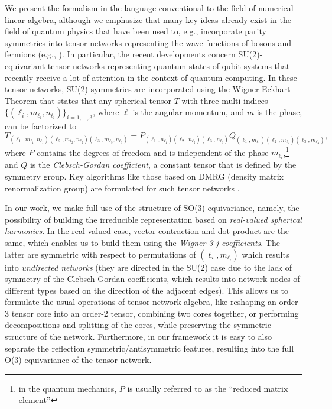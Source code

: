 We present the formalism in the language conventional to the field of numerical linear algebra, although we emphasize that many key ideas already exist in the field of quantum physics that have been used to, e.g., incorporate parity symmetries into tensor networks representing the wave functions of bosons and fermions (e.g., \citep{hutter_representing_2020}).
In particular, the recent developments \citep{orus_tensor_2019} concern SU(2)-equivariant tensor networks \citep{weichselbaum_nonabelian_2012} representing quantum states of qubit systems that recently receive a lot of attention in the context of quantum computing.
In these tensor networks, SU(2) symmetries are incorporated using the Wigner-Eckhart Theorem that states that any spherical tensor $T$ with three multi-indices $\{ (\ell_i,m_{\ell_i},n_{\ell_i}) \}_{i=1,\ldots,3}$, where $\ell$ is the angular momentum, and $m$ is the phase, can be factorized to
\begin{equation}\label{eq:Wigner-Eckhart-Theorem}
    T_{(\ell_1,m_{\ell_1},n_{\ell_1})(\ell_2,m_{\ell_2},n_{\ell_2})(\ell_3,m_{\ell_3},n_{\ell_3})}
    =
    P_{(\ell_1,n_{\ell_1})(\ell_2,n_{\ell_2})(\ell_3,n_{\ell_3})}
    Q_{(\ell_1,m_{\ell_1})(\ell_2,m_{\ell_2})(\ell_3,m_{\ell_3})}
    ,
\end{equation}
where $P$ contains the degrees of freedom and is independent of the phase $m_{\ell_i}$,\footnote{in the quantum mechanics, $P$ is usually referred to as the ``reduced matrix element''} and $Q$ is the \emph{Clebsch-Gordan coefficient}, a constant tensor that is defined by the symmetry group.
Key algorithms like those based on DMRG (density matrix renormalization group) are formulated for such tensor networks \citep{orus_tensor_2019}.

In our work, we make full use of the structure of SO(3)-equivariance, namely, the possibility of building the irreducible representation based on \emph{real-valued spherical harmonics}.
In the real-valued case, vector contraction and dot product are the same, which enables us to build them using the \emph{Wigner 3-j coefficients}.
The latter are symmetric with respect to permutations of $(\ell_i,m_{\ell_i})$ which results into \emph{undirected networks} (they are directed in the SU(2) case due to the lack of symmetry of the Clebsch-Gordan coefficients, which results into network nodes of different types based on the direction of the adjacent edges).
This allows us to formulate the usual operations of tensor network algebra, like reshaping an order-3 tensor core into an order-2 tensor, combining two cores together, or performing decompositions and splitting of the cores, while preserving the symmetric structure of the network.
Furthermore, in our framework it is easy to also separate the reflection symmetric/antisymmetric features, resulting into the full O(3)-equivariance of the tensor network.

